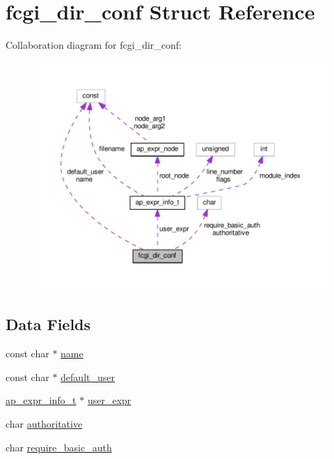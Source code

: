 \hypertarget{structfcgi__dir__conf}{}\section{fcgi\+\_\+dir\+\_\+conf Struct Reference}
\label{structfcgi__dir__conf}


Collaboration diagram for fcgi\+\_\+dir\+\_\+conf\+:
\nopagebreak
\begin{figure}[H]
\begin{center}
\leavevmode
\includegraphics[width=350pt]{structfcgi__dir__conf__coll__graph}
\end{center}
\end{figure}
\subsection*{Data Fields}
\begin{DoxyCompactItemize}
\item 
const char $\ast$ \hyperlink{structfcgi__dir__conf_af011edd35dd924db4ecff855e7ba18d5}{name}
\item 
const char $\ast$ \hyperlink{structfcgi__dir__conf_a51d61a12f6d5ddcda9413aa56c5b6502}{default\+\_\+user}
\item 
\hyperlink{structap__expr__info__t}{ap\+\_\+expr\+\_\+info\+\_\+t} $\ast$ \hyperlink{structfcgi__dir__conf_aa2b5aef08369556dac22723054080f32}{user\+\_\+expr}
\item 
char \hyperlink{structfcgi__dir__conf_a13173cd0669513b1dd84f7ce26836752}{authoritative}
\item 
char \hyperlink{structfcgi__dir__conf_a4809113d3afe777d0a0fecd7ccd1b4c5}{require\+\_\+basic\+\_\+auth}
\end{DoxyCompactItemize}


